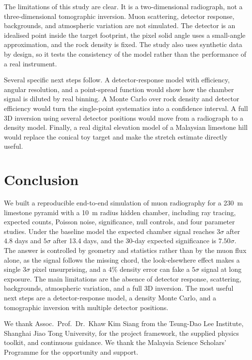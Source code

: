 \documentclass{article}
\begin{document}
The limitations of this study are clear. It is a two-dimensional radiograph,
not a three-dimensional tomographic inversion. Muon scattering, detector
response, backgrounds, and atmospheric variation are not simulated. The
detector is an idealised point inside the target footprint, the pixel solid
angle uses a small-angle approximation, and the rock density is fixed. The
study also uses synthetic data by design, so it tests the consistency of the
model rather than the performance of a real instrument.

Several specific next steps follow. A detector-response model with efficiency,
angular resolution, and a point-spread function would show how the chamber
signal is diluted by real binning. A Monte Carlo over rock density and detector
efficiency would turn the single-point systematics into a confidence interval.
A full 3D inversion using several detector positions would move from a
radiograph to a density model. Finally, a real digital elevation model of a
Malaysian limestone hill would replace the conical toy target and make the
stretch estimate directly useful.

\section{Conclusion}

We built a reproducible end-to-end simulation of muon radiography for a
230~m limestone pyramid with a 10~m radius hidden chamber, including ray
tracing, expected counts, Poisson noise, significance, null controls, and four
parameter studies. Under the baseline model the expected chamber signal reaches
$3\sigma$ after 4.8 days and $5\sigma$ after 13.4 days, and the 30-day expected
significance is $7.50\sigma$. The answer is controlled by geometry and
statistics rather than by the muon flux alone, as the signal follows the missing
chord, the look-elsewhere effect makes a single $3\sigma$ pixel unsurprising,
and a 4\% density error can fake a $5\sigma$ signal at long exposure. The main
limitations are the absence of detector response, scattering, backgrounds,
atmospheric variation, and a full 3D inversion. The most useful next steps are
a detector-response model, a density Monte Carlo, and a tomographic inversion
with multiple detector positions.

\begin{ack}
We thank Assoc.\ Prof.\ Dr.\ Khaw Kim Siang from the
Tsung-Dao Lee Institute, Shanghai Jiao Tong University, for the project
framework, the supplied physics toolkit, and continuous guidance. We thank the
Malaysia Science Scholars' Programme for the opportunity and support.
\end{ack}
\end{document}
